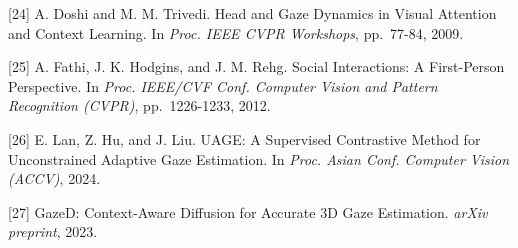 \documentclass[
]{article}
\begin{document}
{[}24{]} A. Doshi and M. M. Trivedi. Head and Gaze Dynamics in Visual
Attention and Context Learning. In \emph{Proc. IEEE CVPR Workshops},
pp.~77-84, 2009.

{[}25{]} A. Fathi, J. K. Hodgins, and J. M. Rehg. Social Interactions: A
First-Person Perspective. In \emph{Proc. IEEE/CVF Conf. Computer Vision
and Pattern Recognition (CVPR)}, pp.~1226-1233, 2012.

{[}26{]} E. Lan, Z. Hu, and J. Liu. UAGE: A Supervised Contrastive
Method for Unconstrained Adaptive Gaze Estimation. In \emph{Proc. Asian
Conf. Computer Vision (ACCV)}, 2024.

{[}27{]} GazeD: Context-Aware Diffusion for Accurate 3D Gaze Estimation.
\emph{arXiv preprint}, 2023.
\end{document}
